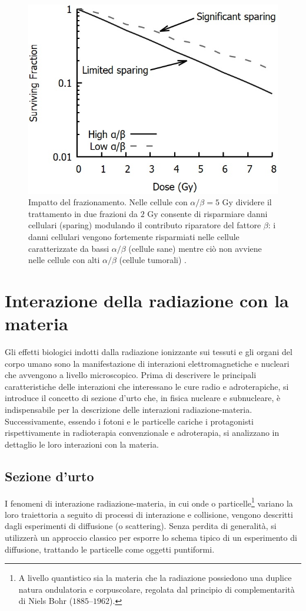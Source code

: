 \documentclass[12pt,a4paper,twoside]{report}
\begin{document}
	\begin{figure}[H]
		\centering
		\includegraphics[width=0.9\linewidth]{sparing.jpg}
		\caption{Impatto del frazionamento. Nelle cellule con $\alpha/\beta=5\mbox{ Gy}$ dividere il trattamento in due frazioni da $2\mbox{ Gy}$ consente di risparmiare danni cellulari (sparing) modulando il contributo riparatore del fattore $\beta$: i danni cellulari vengono fortemente risparmiati nelle cellule caratterizzate da bassi $\alpha/\beta$ (cellule sane) mentre ciò non avviene nelle cellule con alti $\alpha/\beta$ (cellule tumorali) \cite{McMahon_2019}.}
		\label{fig:sparing}
	\end{figure}
	
	\section{Interazione della radiazione con la materia}
	Gli effetti biologici indotti dalla radiazione ionizzante sui tessuti e gli organi del corpo umano sono la manifestazione di interazioni elettromagnetiche e nucleari che avvengono a livello microscopico. Prima di descrivere le principali caratteristiche delle interazioni che interessano le cure radio e adroterapiche, si introduce il concetto di sezione d'urto che, in fisica nucleare e subnucleare, è indispensabile per la descrizione delle interazioni radiazione-materia. Successivamente, essendo i fotoni e le particelle cariche i protagonisti rispettivamente in radioterapia convenzionale e adroterapia, si analizzano in dettaglio le loro interazioni con la materia.
	
	\subsection{Sezione d'urto}\label{sec:sezione_urto}
	I fenomeni di interazione radiazione-materia, in cui onde o particelle\footnote{A livello quantistico sia la materia che la radiazione possiedono una duplice natura ondulatoria e corpuscolare, regolata dal principio di complementarità di Niels Bohr ($1885$--$1962$).} variano la loro traiettoria a seguito di processi di interazione e collisione, vengono descritti dagli esperimenti di diffusione (o scattering). Senza perdita di generalità, si utilizzerà un approccio classico per esporre lo schema tipico di un esperimento di diffusione, trattando le particelle come oggetti puntiformi.
	
\end{document}
